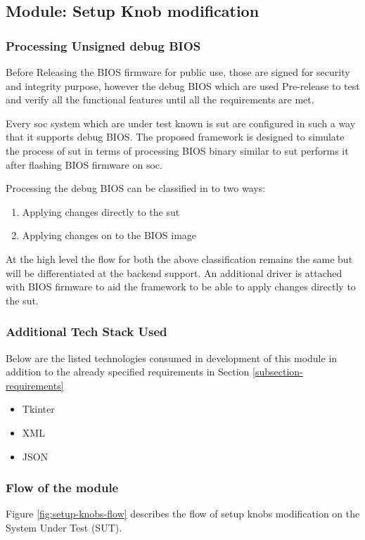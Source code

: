 \subsection{Module: Setup Knob modification}\label{module-setup-knob-modification}

\subsubsection{Processing Unsigned debug BIOS}\label{subsection-processing-bios}
Before Releasing the BIOS firmware for public use, those are signed for security and integrity purpose, however the debug BIOS which are used Pre-release to test and verify all the functional features until all the requirements are met.

Every \gls{soc} system which are under test known is \gls{sut} are configured in such a way that it supports debug BIOS. The proposed framework is designed to simulate the process of \gls{sut} in terms of processing BIOS binary similar to \gls{sut} performs it after flashing BIOS firmware on \gls{soc}.

Processing the debug BIOS can be classified in to two ways:
\begin{enumerate}\label{cli-classification-proposed-work}
	\item Applying changes directly to the \gls{sut}
	\item Applying changes on to the BIOS image
\end{enumerate}

At the high level the flow for both the above classification remains the same but will be differentiated at the backend support. An additional driver is attached with BIOS firmware to aid the framework to be able to apply changes directly to the \gls{sut}.

\subsubsection{Additional Tech Stack Used}
Below are the listed technologies consumed in development of this module in addition to the already specified requirements in Section \ref{subsection-requirements}
\begin{itemize}
	\item Tkinter
	\item XML
	\item JSON
\end{itemize}

\subsubsection{Flow of the module}
Figure \ref{fig:setup-knobs-flow} describes the flow of setup knobs modification on the System Under Test (SUT).


